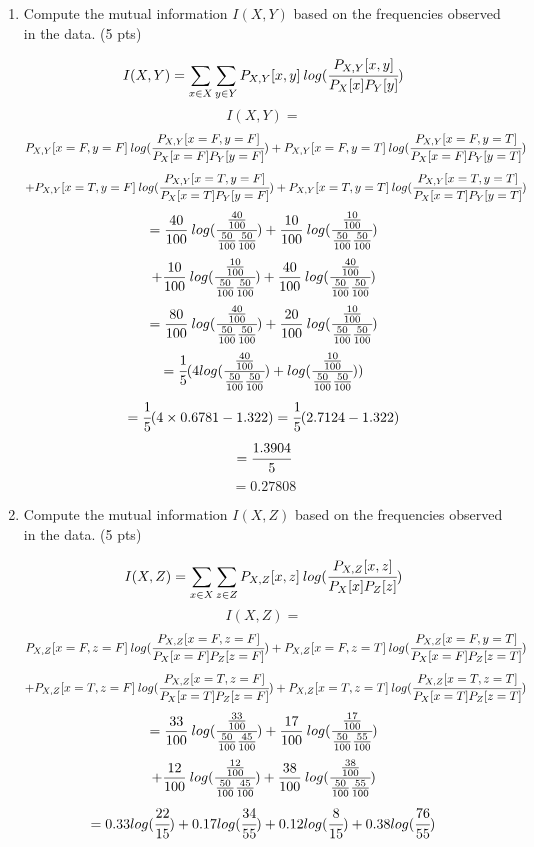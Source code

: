 \documentclass[a4paper]{article}
\theoremstyle{definition}
\newenvironment{soln}{
    \leavevmode\color{blue}\ignorespaces
}{}
\begin{document}
\begin{enumerate}
	\item Compute the mutual information $I(X, Y)$ based on the frequencies observed in the data. (5 pts)
	\begin{soln}
        \[  I(X, Y) = \sum_{x \in X} \sum_{y \in Y} P_{X,Y}[x, y]\:log(\cfrac{P_{X,Y}[x, y]}{P_X[x]P_Y[y]})  \]
        \[  I(X, Y) = \]
        \[ P_{X,Y}[x=F, y=F]\:log(\cfrac{P_{X,Y}[x=F, y=F]}{P_X[x=F]P_Y[y=F]}) + P_{X,Y}[x=F, y=T]\:log(\cfrac{P_{X,Y}[x=F, y=T]}{P_X[x=F]P_Y[y=T]})\]
        \[  + P_{X,Y}[x=T, y=F]\:log(\cfrac{P_{X,Y}[x=T, y=F]}{P_X[x=T]P_Y[y=F]}) + P_{X,Y}[x=T, y=T]\:log(\cfrac{P_{X,Y}[x=T, y=T]}{P_X[x=T]P_Y[y=T]})\]
        \[  = \frac{40}{100}\:log(\cfrac{\frac{40}{100}}{\frac{50}{100}\frac{50}{100}}) + \frac{10}{100}\:log(\cfrac{\frac{10}{100}}{\frac{50}{100}\frac{50}{100}})\]
        \[  + \frac{10}{100}\:log(\cfrac{\frac{10}{100}}{\frac{50}{100}\frac{50}{100}}) + \frac{40}{100}\:log(\cfrac{\frac{40}{100}}{\frac{50}{100}\frac{50}{100}})\]
        \[  = \frac{80}{100}\:log(\cfrac{\frac{40}{100}}{\frac{50}{100}\frac{50}{100}}) + \frac{20}{100}\:log(\cfrac{\frac{10}{100}}{\frac{50}{100}\frac{50}{100}})\]
        \[  = \cfrac{1}{5} (4log(\cfrac{\frac{40}{100}}{\frac{50}{100}\frac{50}{100}}) + log(\cfrac{\frac{10}{100}}{\frac{50}{100}\frac{50}{100}})) \]
        \[  = \cfrac{1}{5} (4\times0.6781 - 1.322) = \cfrac{1}{5} (2.7124 - 1.322)\]
        \[  = \cfrac{1.3904}{5} \]
        \[  = 0.27808\]
    \end{soln}
	\item Compute the mutual information $I(X, Z)$ based on the frequencies observed in the data. (5 pts)
	\begin{soln}
        \[  I(X, Z) = \sum_{x \in X} \sum_{z \in Z} P_{X,Z}[x, z]\:log(\cfrac{P_{X,Z}[x, z]}{P_X[x]P_Z[z]})  \]
        \[  I(X, Z) = \]
        \[ P_{X,Z}[x=F, z=F]\:log(\cfrac{P_{X,Z}[x=F, z=F]}{P_X[x=F]P_Z[z=F]}) + P_{X,Z}[x=F, z=T]\:log(\cfrac{P_{X,Z}[x=F, y=T]}{P_X[x=F]P_Z[z=T]})\]
        \[  + P_{X,Z}[x=T, z=F]\:log(\cfrac{P_{X,Z}[x=T, z=F]}{P_X[x=T]P_Z[z=F]}) + P_{X,Z}[x=T, z=T]\:log(\cfrac{P_{X,Z}[x=T, z=T]}{P_X[x=T]P_Z[z=T]})\]
        \[  = \frac{33}{100}\:log(\cfrac{\frac{33}{100}}{\frac{50}{100}\frac{45}{100}}) + \frac{17}{100}\:log(\cfrac{\frac{17}{100}}{\frac{50}{100}\frac{55}{100}})\]
        \[  + \frac{12}{100}\:log(\cfrac{\frac{12}{100}}{\frac{50}{100}\frac{45}{100}}) + \frac{38}{100}\:log(\cfrac{\frac{38}{100}}{\frac{50}{100}\frac{55}{100}})\]
        \[  = 0.33log(\cfrac{22}{15}) + 0.17log(\cfrac{34}{55}) + 0.12log(\cfrac{8}{15}) + 0.38log(\cfrac{76}{55}) \]

\end{soln}
\end{enumerate}
\end{document}
